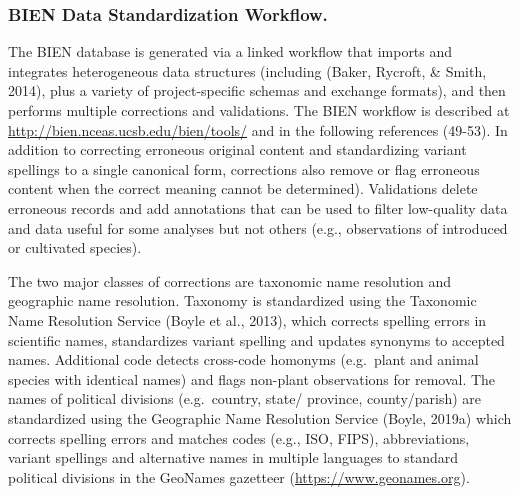 \documentclass[]{article}
\begin{document}
\hypertarget{bien-data-standardization-workflow.}{%
\subsubsection{BIEN Data Standardization Workflow.}\label{bien-data-standardization-workflow.}}

The BIEN database is generated via a linked workflow that imports and integrates heterogeneous data structures (including (Baker, Rycroft, \& Smith, 2014), plus a variety of project-specific schemas and exchange formats), and then performs multiple corrections and validations. The BIEN workflow is described at \url{http://bien.nceas.ucsb.edu/bien/tools/} and in the following references (49-53). In addition to correcting erroneous original content and standardizing variant spellings to a single canonical form, corrections also remove or flag erroneous content when the correct meaning cannot be determined). Validations delete erroneous records and add annotations that can be used to filter low-quality data and data useful for some analyses but not others (e.g., observations of introduced or cultivated species).

The two major classes of corrections are taxonomic name resolution and geographic name resolution. Taxonomy is standardized using the Taxonomic Name Resolution Service (Boyle et al., 2013), which corrects spelling errors in scientific names, standardizes variant spelling and updates synonyms to accepted names. Additional code detects cross-code homonyms (e.g.~plant and animal species with identical names) and flags non-plant observations for removal. The names of political divisions (e.g.~country, state/ province, county/parish) are standardized using the Geographic Name Resolution Service (Boyle, 2019a) which corrects spelling errors and matches codes (e.g., ISO, FIPS), abbreviations, variant spellings and alternative names in multiple languages to standard political divisions in the GeoNames gazetteer (\url{https://www.geonames.org}).
\end{document}
